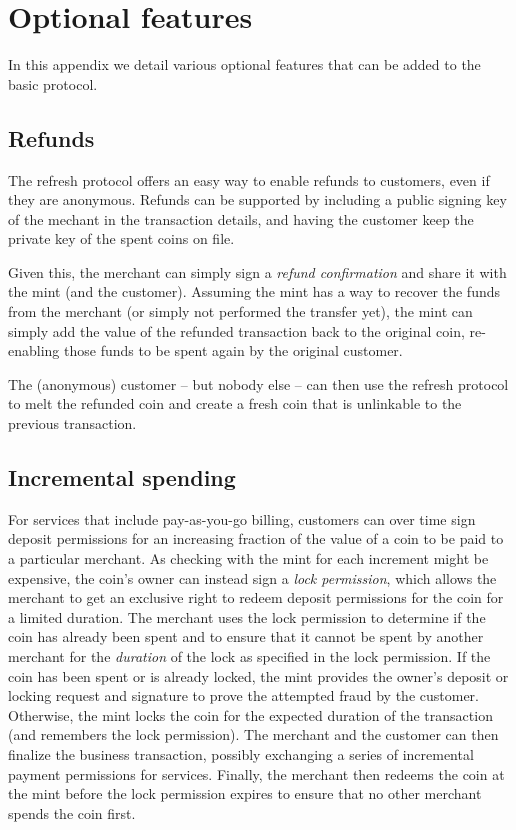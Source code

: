 \documentclass{llncs}
\begin{document}



\appendix

\section{Optional features}

In this appendix we detail various optional features that can
be added to the basic protocol.

\subsection{Refunds}

The refresh protocol offers an easy way to enable refunds to
customers, even if they are anonymous.  Refunds can be supported
by including a public signing key of the mechant in the transaction
details, and having the customer keep the private key of the spent
coins on file.

Given this, the merchant can simply sign a {\em refund confirmation}
and share it with the mint (and the customer).  Assuming the mint has
a way to recover the funds from the merchant (or simply not performed
the transfer yet), the mint can simply add the value of the refunded
transaction back to the original coin, re-enabling those funds to be
spent again by the original customer.

The (anonymous) customer -- but nobody else -- can then use the
refresh protocol to melt the refunded coin and create a fresh coin
that is unlinkable to the previous transaction.


\subsection{Incremental spending}

For services that include pay-as-you-go billing, customers can over
time sign deposit permissions for an increasing fraction of the value
of a coin to be paid to a particular merchant.  As checking with the
mint for each increment might be expensive, the coin's owner can
instead sign a {\em lock permission}, which allows the merchant to get
an exclusive right to redeem deposit permissions for the coin for a
limited duration.  The merchant uses the lock permission to determine
if the coin has already been spent and to ensure that it cannot be
spent by another merchant for the {\em duration} of the lock as
specified in the lock permission.  If the coin has been spent or is
already locked, the mint provides the owner's deposit or locking
request and signature to prove the attempted fraud by the customer.
Otherwise, the mint locks the coin for the expected duration of the
transaction (and remembers the lock permission).  The merchant and the
customer can then finalize the business transaction, possibly
exchanging a series of incremental payment permissions for services.
Finally, the merchant then redeems the coin at the mint before the
lock permission expires to ensure that no other merchant spends the
coin first.
\end{document}
